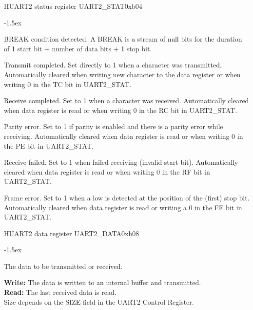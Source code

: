 \documentclass[12pt]{article}
\begin{document}
\begin{register}{H}{UART2 status register UART2\_STAT}{0xb04}
\label{uart2stat}
%
%
%
%
%
%
\regnewline%
\end{register}
\begin{regdesc}[0.8\textwidth]\begin{reglist}[0000]
\itemsep-1.5ex
\item[BR] BREAK condition detected. A BREAK is a stream of null bits for the duration of 1 start bit + number of data bits + 1 stop bit.
\item[TC] Transmit completed. Set directly to 1 when a character was transmitted. Automatically cleared when writing new character to the data register or when writing 0 in the TC bit in \mbox{UART2\_STAT}.
\item[RC] Receive completed. Set to 1 when a character was received. Automatically cleared when data register is read or when writing 0 in the RC bit in UART2\_STAT.
\item[PE] Parity error. Set to 1 if parity is enabled and there is a parity error while receiving. Automatically cleared when data register is read or when writing 0 in the PE bit in UART2\_STAT.
\item[RF] Receive failed. Set to 1 when failed receiving (invalid start bit). Automatically cleared when data register is read or when writing 0 in the RF bit in UART2\_STAT.
\item [FE] Frame error. Set to 1 when a low is detected at the position of the (first) stop bit. Automatically cleared when data register is read or writing a 0 in the FE bit in UART2\_STAT.
\end{reglist}\end{regdesc}

\begin{register}{H}{UART2 data register UART2\_DATA}{0xb08}
\label{uart2data}
%
\regnewline%
\end{register}
\begin{regdesc}[0.6\textwidth]\begin{reglist}[000000000]
\itemsep-1.5ex
\item[DATA] The data to be transmitted or received.
\end{reglist}\end{regdesc}
\textbf{Write:} The data is written to an internal buffer and transmitted.\\
\textbf{Read:} The last received data is read. \\
Size depends on the SIZE field in the UART2 Control Register.
\end{document}
